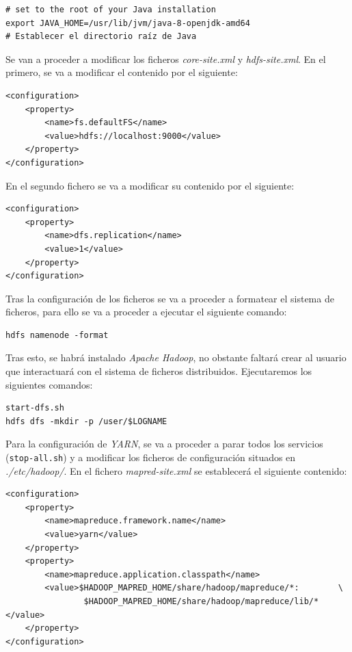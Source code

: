 \documentclass[11pt,a4paper]{article}
\begin{document}
\begin{lstlisting}
# set to the root of your Java installation
export JAVA_HOME=/usr/lib/jvm/java-8-openjdk-amd64
# Establecer el directorio raíz de Java
\end{lstlisting}

Se van a proceder a modificar los ficheros \emph{core-site.xml} y \emph{hdfs-site.xml}. En el primero, se va a modificar el contenido por el siguiente:

\begin{lstlisting}
<configuration>
    <property>
        <name>fs.defaultFS</name>
        <value>hdfs://localhost:9000</value>
    </property>
</configuration>
\end{lstlisting}

En el segundo fichero se va a modificar su contenido por el siguiente:

\begin{lstlisting}
<configuration>
    <property>
        <name>dfs.replication</name>
        <value>1</value>
    </property>
</configuration>
\end{lstlisting}

Tras la configuración de los ficheros se va a proceder a formatear el sistema de ficheros, para ello se va a proceder a ejecutar el siguiente comando:

\begin{lstlisting}
hdfs namenode -format
\end{lstlisting}

Tras esto, se habrá instalado \emph{Apache Hadoop}, no obstante faltará crear al usuario que interactuará con el sistema de ficheros distribuidos. Ejecutaremos los siguientes comandos:

\begin{lstlisting}
start-dfs.sh
hdfs dfs -mkdir -p /user/$LOGNAME
\end{lstlisting}

Para la configuración de \emph{YARN}, se va a proceder a parar todos los servicios (\texttt{stop-all.sh}) y a modificar los ficheros de configuración situados en \emph{./etc/hadoop/}. En el fichero \emph{mapred-site.xml} se establecerá el siguiente contenido:

\begin{lstlisting}
<configuration>
    <property>
        <name>mapreduce.framework.name</name>
        <value>yarn</value>
    </property>
    <property>
        <name>mapreduce.application.classpath</name>
        <value>$HADOOP_MAPRED_HOME/share/hadoop/mapreduce/*:		\
        		$HADOOP_MAPRED_HOME/share/hadoop/mapreduce/lib/*</value>
    </property>
</configuration>
\end{lstlisting}
\end{document}
